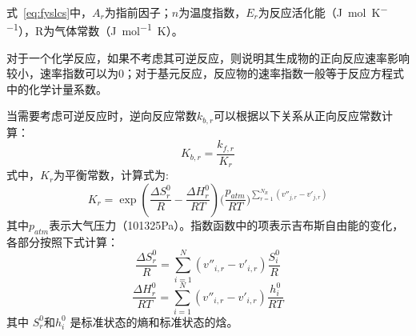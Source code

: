 式~\ref{eq:fyslcs}中，$A_r$为指前因子；$n$为温度指数，$E_r$为反应活化能（\si{\joule\per\mole\per\kelvin}），R为气体常数（\si{\joule\per\mole\kelvin}）。

对于一个化学反应，如果不考虑其可逆反应，则说明其生成物的正向反应速率影响较小，速率指数可以为0；对于基元反应，反应物的速率指数一般等于反应方程式中的化学计量系数。

当需要考虑可逆反应时，逆向反应常数$k_{b,r}$可以根据以下关系从正向反应常数计算：
\begin{equation}
K_{b,r} = \frac{k_{f,r}}{K_r}\label{eq:nxfycs}
\end{equation}
式中，$K_r$为平衡常数，计算式为:
\begin{equation}
{K_r} = \exp \left( {\frac{{\Delta S_r^0}}{R} - \frac{{\Delta H_r^0}}{{RT}}} \right){\bigg( {\frac{{{p_{atm}}}}{{RT}}} \bigg)^{\displaystyle\sum\limits_{r = 1}^{{N_R}} {\left( {{{v''}_{j,r}} - {{v'}_{j,r}}} \right)} }}
\end{equation}
其中$p_{atm}$表示大气压力（101325Pa）。指数函数中的项表示吉布斯自由能的变化，各部分按照下式计算：
\begin{equation}
\frac{{\Delta S_r^0}}{R} = \sum\limits_{i = 1}^N {\left( {{{v''}_{i,r}} - {{v'}_{i,r}}} \right)\frac{{S_i^0}}{R}}
\end{equation}
\begin{equation}
\frac{{\Delta H_r^0}}{{RT}} = \sum\limits_{i = 1}^N {\left( {{{v''}_{i,r}} - {{v'}_{i,r}}} \right)\frac{{h_i^0}}{{RT}}} 
\end{equation}
其中 $S_r^0$和$h_i^0$ 是标准状态的熵和标准状态的焓。

